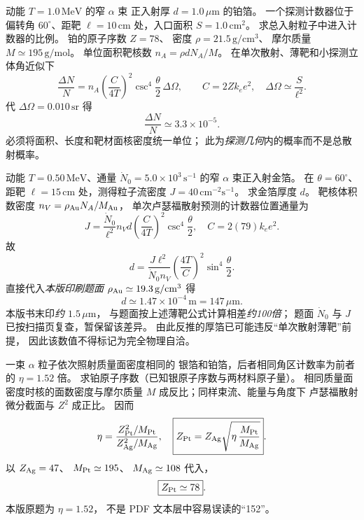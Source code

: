 动能 $T=1.0\,\mathrm{MeV}$ 的窄 $\alpha$ 束
正入射厚 $d=1.0\,\mu\mathrm m$ 的铂箔。
一个探测计数器位于偏转角 $60^\circ$、距靶
$\ell=10\,\mathrm{cm}$ 处，入口面积
$S=1.0\,\mathrm{cm^2}$。
求总入射粒子中进入计数器的比例。
\exsolution
铂的原子序数 $Z=78$、
密度 $\rho=21.5\,\mathrm{g/cm^3}$、
摩尔质量 $M\simeq195\,\mathrm{g/mol}$。
单位面积靶核数
$n_A=\rho dN_A/M$。
在单次散射、薄靶和小探测立体角近似下
\[
 \frac{\Delta N}{N}=
 n_A\left(\frac C{4T}\right)^2
 \csc^4\frac\theta2\,\Delta\Omega,\qquad
 C=2Zk_ee^2,\quad \Delta\Omega\simeq\frac S{\ell^2}.
\]
代 $\Delta\Omega=0.010\,\mathrm{sr}$ 得
\[
 \boxed{\frac{\Delta N}{N}\simeq3.3\times10^{-5}}.
\]
\excheck 必须将面积、长度和靶材面核密度统一单位；
此为\emph{探测几何}内的概率而不是总散射概率。

动能 $T=0.50\,\mathrm{MeV}$、通量
$\dot N_0=5.0\times10^3\,\mathrm{s^{-1}}$
的窄 $\alpha$ 束正入射金箔。
在 $\theta=60^\circ$、距靶 $\ell=15\,\mathrm{cm}$
处，测得粒子流密度
$J=40\,\mathrm{cm^{-2}s^{-1}}$。
求金箔厚度 $d$。
\exsolution
靶核体积数密度
$n_V=\rho_{\rm Au}N_A/M_{\rm Au}$，
单次卢瑟福散射预测的计数器位置通量为
\[
 J=\frac{\dot N_0}{\ell^2}
 n_Vd\left(\frac C{4T}\right)^2
 \csc^4\frac\theta2,\quad C=2(79)k_ee^2.
\]
故
\[
 \boxed{d=\frac{J\ell^2}{\dot N_0n_V}
 \left(\frac{4T}{C}\right)^2
 \sin^4\frac\theta2}.
\]
直接代入\emph{本版印刷题面}
$\rho_{\rm Au}\simeq19.3\,\mathrm{g/cm^3}$ 得
\[
 \boxed{d\simeq1.47\times10^{-4}\,\mathrm m
 =147\,\mu\mathrm m}.
\]
\excheck 本版书末印\emph{约 $1.5\,\mu\mathrm m$}，
与题面按上述薄靶公式计算相差\emph{约100倍}；
题面 $\dot N_0$ 与 $J$ 已按扫描页复查，暂保留该差异。
由此反推的厚箔已可能违反“单次散射薄靶”前提，
因此该数值不得标记为完全物理自洽。

一束 $\alpha$ 粒子依次照射质量面密度相同的
银箔和铂箔，后者相同角区计数率为前者的
$\eta=1.52$ 倍。
求铂原子序数（已知银原子序数与两材料原子量）。
\exsolution
相同质量面密度时核的面数密度与摩尔质量
$M$ 成反比；同样束流、能量与角度下
卢瑟福散射微分截面与 $Z^2$ 成正比。
因而
\[
 \eta=\frac{Z_{\rm Pt}^2/M_{\rm Pt}}
 {Z_{\rm Ag}^2/M_{\rm Ag}},\quad
 \boxed{Z_{\rm Pt}=Z_{\rm Ag}
 \sqrt{\eta\,\frac{M_{\rm Pt}}{M_{\rm Ag}}}}.
\]
以 $Z_{\rm Ag}=47$、
$M_{\rm Pt}\simeq195$、
$M_{\rm Ag}\simeq108$ 代入，
\[
 \boxed{Z_{\rm Pt}\simeq78}.
\]
\excheck 本版原题为 $\eta=1.52$，
不是 PDF 文本层中容易误读的“152”。

